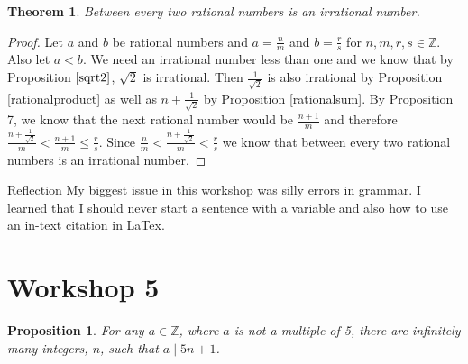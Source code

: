 \documentclass{article}
\newtheorem{theorem}{Theorem}
\newtheorem{prop}{Proposition}
\begin{document}
\begin{theorem} \label{betweentworationals}
Between every two rational numbers is an irrational number.
\end{theorem}
\begin{proof}
Let $a$ and $b$ be rational numbers and $a=\frac{n}{m}$ and $b=\frac{r}{s}$ for $n,m,r,s\in\mathbb{Z}$. Also let $a<b$. We need an irrational number less than one and we know that by Proposition $\ref{sqrt2}$, $\sqrt{2}$ is irrational. Then $\frac{1}{\sqrt{2}}$ is also irrational by Proposition \ref{rationalproduct} as well as $n+\frac{1}{\sqrt{2}}$ by Proposition \ref{rationalsum}. By Proposition 7, we know that the next rational number would be $\frac{n+1}{m}$ and therefore $\frac{n+\frac{1}{\sqrt{2}}}{m}<\frac{n+1}{m}\leq\frac{r}{s}$. Since $\frac{n}{m}<\frac{n+\frac{1}{\sqrt{2}}}{m}<\frac{r}{s}$ we know that between every two rational numbers is an irrational number.
\end{proof}

\begin{subsection}{Reflection}
My biggest issue in this workshop was silly errors in grammar. I learned that I should never start a sentence with a variable and also how to use an in-text citation in LaTex.
\end{subsection}

\section{Workshop 5}
\begin{prop}
For any $a\in\mathbb{Z}$, where $a$ is not a multiple of 5, there are infinitely many integers, $n$, such that $a\mid5n+1$.
\end{prop}
\end{document}
